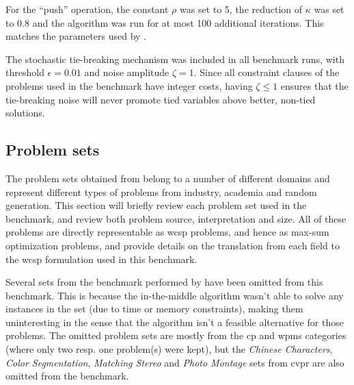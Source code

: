 For the \enquote{push} operation, the constant \(\rho\) was set to \num{5}, the reduction of \(\kappa\) was set to \num{0.8} and the algorithm was run for at most \num{100} additional iterations.
This matches the parameters used by \textcite{Bastert10}.

The stochastic tie-breaking mechanism was included in all benchmark runs, with threshold \(\epsilon=\num{0.01}\) and noise amplitude \(\zeta=1\).
Since all constraint clauses of the problems used in the benchmark have integer costs, having \(\zeta\leq1\) ensures that the tie-breaking noise will never promote tied variables above better, non-tied solutions.

\subsection{Problem sets}
The problem sets obtained from \textcite{deGivry14} belong to a number of different domains and represent different types of problems from industry, academia and random generation.
This section will briefly review each problem set used in the benchmark, and review both problem source, interpretation and size.
All of these problems are directly representable as \gls{wcsp} problems, and hence as max-sum optimization problems, and \textcite{deGivry14} provide details on the translation from each field to the \gls{wcsp} formulation used in this benchmark.

Several sets from the benchmark performed by \textcite{deGivry14} have been omitted from this benchmark.
This is because the in-the-middle algorithm wasn't able to solve any instances in the set (due to time or memory constraints), making them uninteresting in the sense that the algorithm isn't a feasible alternative for those problems. 
The omitted problem sets are mostly from the \gls{cp} and \gls{wpms} categories (where only two resp. one problem(s) were kept), but the \emph{Chinese Characters}, \emph{Color Segmentation}, \emph{Matching Stereo} and \emph{Photo Montage} sets from \gls{cvpr} are also omitted from the benchmark.


